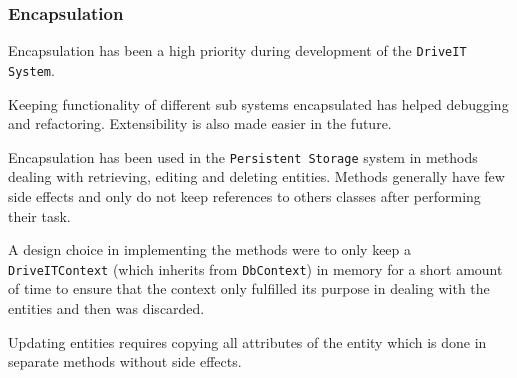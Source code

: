 \subsubsection{Encapsulation}
Encapsulation has been a high priority during development of the \texttt{DriveIT System}. 

Keeping functionality of different sub systems encapsulated has helped debugging and refactoring. Extensibility is also made easier in the future.

Encapsulation has been used in the \texttt{Persistent Storage} system in methods dealing with retrieving, editing and deleting entities. Methods generally have few side effects and only do not keep references to others classes after performing their task.

A design choice in implementing the methods were to only keep a \texttt{DriveITContext} (which inherits from \texttt{DbContext}) in memory for a short amount of time to ensure that the context only fulfilled its purpose in dealing with the entities and then was discarded.

Updating entities requires copying all attributes of the entity which is done in separate methods without side effects.